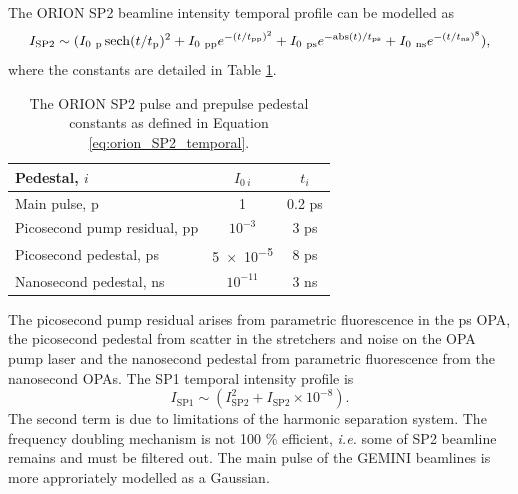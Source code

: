 The ORION SP2 beamline intensity temporal profile can be modelled as
\begin{equation}\label{eq:orion_SP2_temporal}
	I_\mathrm{SP2} \sim (I_{0 \ \mathrm{p}}\sech(t/t_\mathrm{p})^2 + I_{0 \ \mathrm{pp}}e^{-(t/t_\mathrm{pp})^2} + I_{0 \ \mathrm{ps}}e^{-\mathrm{abs}(t)/t_\mathrm{ps}} + I_{0 \ \mathrm{ns}}e^{-(t/t_\mathrm{ns})^8}),
\end{equation}
where the constants are detailed in Table \ref{tab:orion_pedestals}.
\begin{table}[]
	\centering
	\begin{tabular}{lcc}
		\hline\hline
		Pedestal, $i$                & $I_{0 \ i}$ & $t_i$  \\ \hline
		Main pulse, p                & 1           & 0.2 ps \\
		Picosecond pump residual, pp & $10^{-3}$   & 3 ps   \\
		Picosecond pedestal, ps      & \num{5e-5}  & 8 ps   \\
		Nanosecond pedestal, ns      & $10^{-11}$  & 3 ns  \\ \hline \hline
	\end{tabular}
	\caption{The ORION SP2 pulse and prepulse pedestal constants as defined in Equation \ref{eq:orion_SP2_temporal}.}
	\label{tab:orion_pedestals}
\end{table}
The picosecond pump residual arises from parametric fluorescence in the ps OPA, the picosecond pedestal from scatter in the stretchers and noise on the OPA pump laser and the nanosecond pedestal from parametric fluorescence from the nanosecond OPAs. 
The SP1 temporal intensity profile is
\begin{equation}
	I_\mathrm{SP1} \sim (I_\mathrm{SP2}^2 + I_\mathrm{SP2} \times 10^{-8}).
\end{equation}
The second term is due to limitations of the harmonic separation system. The frequency doubling mechanism is not 100 \% efficient, \textit{i.e.} some of SP2 beamline remains and must be filtered out. The main pulse of the GEMINI beamlines is more approriately modelled as a Gaussian.

